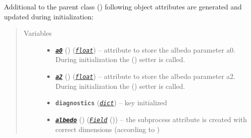 \documentclass[a4paper,10pt,english]{sphinxmanual}
\begin{document}
\begin{fulllineitems}
Additional to the parent class 
{\hyperref[api/climlab.process:climlab.process.diagnostic.DiagnosticProcess]{\emph{}}} ()
following object attributes are generated and updated during initialization:
\begin{quote}\begin{description}
\item[{Variables}] \leavevmode\begin{itemize}
\item {} 
{\hyperref[api/climlab.surface:climlab.surface.albedo.P2Albedo.a0]{\emph{\textbf{\texttt{a0}}}}} () (\href{http://docs.python.org/2.7/library/functions.html\#float}{\emph{\texttt{float}}}) -- attribute to store the albedo parameter a0. 
During initialization the 
{\hyperref[api/climlab.surface:climlab.surface.albedo.P2Albedo.a0]{\emph{}}} () setter is called.

\item {} 
{\hyperref[api/climlab.surface:climlab.surface.albedo.P2Albedo.a2]{\emph{\textbf{\texttt{a2}}}}} () (\href{http://docs.python.org/2.7/library/functions.html\#float}{\emph{\texttt{float}}}) -- attribute to store the albedo parameter a2. 
During initialization the 
{\hyperref[api/climlab.surface:climlab.surface.albedo.P2Albedo.a2]{\emph{}}} () setter is called.

\item {} 
\textbf{\texttt{diagnostics}} (\href{http://docs.python.org/2.7/library/stdtypes.html\#dict}{\emph{\texttt{dict}}}) -- key  initialized

\item {} 
{\hyperref[api/climlab.surface:climlab.surface.albedo.P2Albedo.albedo]{\emph{\textbf{\texttt{albedo}}}}} () ({\hyperref[api/climlab.domain:climlab.domain.field.Field]{\emph{\emph{\texttt{Field}}}}} ()) -- the subprocess attribute  is
created with correct dimensions 
(according to )

\end{itemize}


\end{description}
\end{quote}
\end{fulllineitems}
\end{document}
